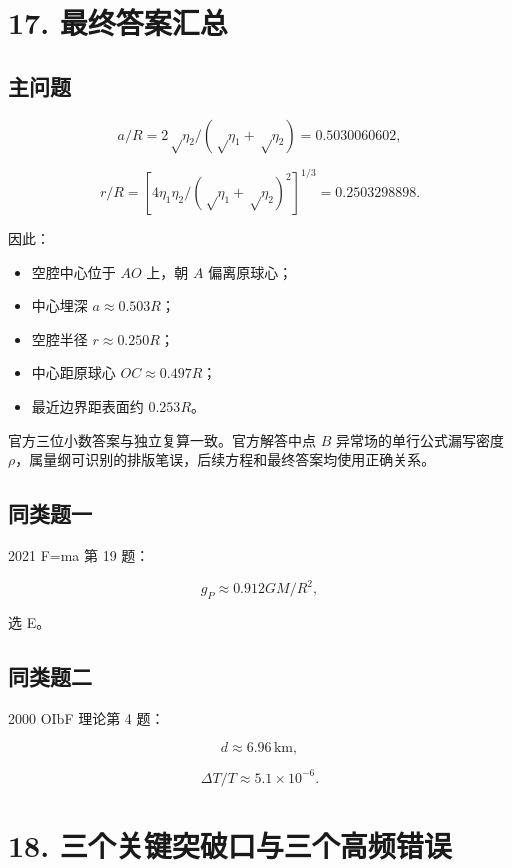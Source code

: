 \documentclass[
  11pt,
  UTF8]{ctexart}
\providecommand{\tightlist}{%
  \setlength{\itemsep}{0pt}\setlength{\parskip}{0pt}}
\begin{document}
\hypertarget{ux6700ux7ec8ux7b54ux6848ux6c47ux603b}{%
\section{17. 最终答案汇总}\label{ux6700ux7ec8ux7b54ux6848ux6c47ux603b}}

\hypertarget{ux4e3bux95eeux9898}{%
\subsection{主问题}\label{ux4e3bux95eeux9898}}

\[a/R=2√η_2/(√η_1+√η_2)=0.5030060602,\]

\[r/R=[4η_1η_2/(√η_1+√η_2)^2]^{1/3}=0.2503298898.\]

因此：

\begin{itemize}
\tightlist
\item
  空腔中心位于 \(AO\) 上，朝 \(A\) 偏离原球心；
\item
  中心埋深 \(a≈0.503R\)；
\item
  空腔半径 \(r≈0.250R\)；
\item
  中心距原球心 \(OC≈0.497R\)；
\item
  最近边界距表面约 \(0.253R\)。
\end{itemize}

官方三位小数答案与独立复算一致。官方解答中点 \(B\)
异常场的单行公式漏写密度
\(ρ\)，属量纲可识别的排版笔误，后续方程和最终答案均使用正确关系。

\hypertarget{ux540cux7c7bux9898ux4e00}{%
\subsection{同类题一}\label{ux540cux7c7bux9898ux4e00}}

2021 F=ma 第 19 题：

\[g_P≈0.912GM/R^2,\]

选 E。

\hypertarget{ux540cux7c7bux9898ux4e8c}{%
\subsection{同类题二}\label{ux540cux7c7bux9898ux4e8c}}

2000 OIbF 理论第 4 题：

\[d≈6.96\,\mathrm{km},\]

\[ΔT/T≈5.1×10^{-6}.\]

\hypertarget{ux4e09ux4e2aux5173ux952eux7a81ux7834ux53e3ux4e0eux4e09ux4e2aux9ad8ux9891ux9519ux8bef}{%
\section{18.
三个关键突破口与三个高频错误}\label{ux4e09ux4e2aux5173ux952eux7a81ux7834ux53e3ux4e0eux4e09ux4e2aux9ad8ux9891ux9519ux8bef}}
\end{document}
